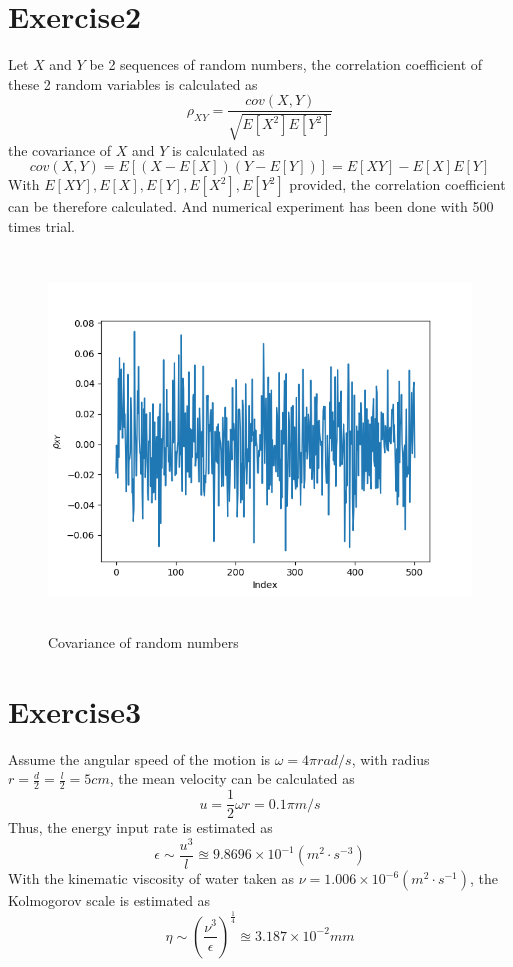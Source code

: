 \documentclass[paper=a4, fontsize=11pt]{scrartcl} %
\numberwithin{equation}{section} %
\numberwithin{figure}{section} %
\numberwithin{table}{section} %
\begin{document}
\section{Exercise2}
  Let $X$ and $Y$ be 2 sequences of random numbers, the correlation coefficient of these 2 random variables is calculated as
  \begin{equation}
  	\rho_{XY} = \frac{cov(X, Y)}{\sqrt{E[X^2] E[Y^2]}}
  \end{equation}
  the covariance of $X$ and $Y$ is calculated as
  \begin{equation}
  	cov(X, Y) = E[(X-E[X])(Y-E[Y])] = E[XY] - E[X]E[Y]
  \end{equation}
  With $E[XY], E[X], E[Y], E[X^2], E[Y^2]$ provided, the correlation coefficient can be therefore calculated. And
  numerical experiment has been done with 500 times trial.
   \begin{figure}[H]
	  	\centering
	  	\includegraphics[height=10cm]{CovPlot.png}
	  	\caption{Covariance of random numbers}
	  	\label{img:cov}
  	\end{figure}
\section{Exercise3}
	Assume the angular speed of the motion is $\omega = 4\pi rad/s$, with radius $r = \frac{d}{2} = \frac{l}{2} = 5cm$, the  mean velocity can be calculated as 
	\begin{equation}
		u = \frac{1}{2} \omega  r = 0.1\pi m/s
	\end{equation}
	Thus, the energy input rate is estimated as
	\begin{equation}
		\epsilon \sim \frac{u^3}{l} \approxeq 9.8696\times10^{-1} (m^2 \cdot s^{-3})
	\end{equation}
	With the kinematic viscosity of water taken as $\nu = 1.006\times10^{-6}  (m^2 \cdot s^{-1})$, the Kolmogorov scale is estimated as
	\begin{equation}
		\eta \sim (\frac{\nu^3}{\epsilon})^{\frac{1}{4}} \approxeq 3.187\times10^{-2}mm
	\end{equation}
\end{document}
